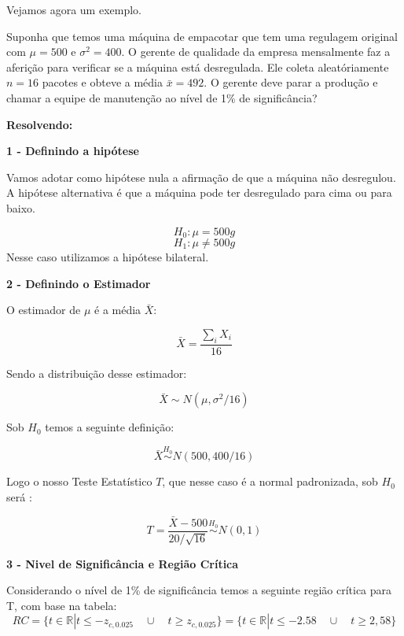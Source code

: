 \documentclass[
  letterpaper,
  DIV=11,
  numbers=noendperiod]{scrartcl}
\begin{document}
Vejamos agora um exemplo.

\begin{exemplo}

Suponha que temos uma máquina de empacotar que tem uma regulagem
original com \(\mu=500\) e \(\sigma^{2}=400\). O gerente de qualidade da
empresa mensalmente faz a aferição para verificar se a máquina está
desregulada. Ele coleta aleatóriamente \(n=16\) pacotes e obteve a média
\(\bar{x}=492\). O gerente deve parar a produção e chamar a equipe de
manutenção ao nível de 1\% de significância?

\end{exemplo}

\textbf{Resolvendo:}

\vspace{0.5cm}

\textbf{1 - Definindo a hipótese}

Vamos adotar como hipótese nula a afirmação de que a máquina não
desregulou. A hipótese alternativa é que a máquina pode ter desregulado
para cima ou para baixo.

\[H_0: \mu=500 g\] \[H_{1}: \mu \neq 500 g\] Nesse caso utilizamos a
hipótese bilateral.

\vspace{0.5cm}

\textbf{2 - Definindo o Estimador}

O estimador de \(\mu\) é a média \(\bar{X}\):

\[\bar{X}=\frac{\sum_iX_i}{16}\]

Sendo a distribuição desse estimador:

\[\bar{X}\sim N(\mu,\sigma^2/16)\]

Sob \(H_0\) temos a seguinte definição:

\[\bar{X}\overset{H_0}{\sim} N(500,400/16)\]

Logo o nosso Teste Estatístico \(T\), que nesse caso é a normal
padronizada, sob \(H_0\) será :

\[T=\frac{\bar{X}-500}{20/\sqrt{16}}\overset{H_0}{\sim} N(0,1)\]

\vspace{0.5cm}

\textbf{3 - Nivel de Significância e Região Crítica}

Considerando o nível de 1\% de significância temos a seguinte região
crítica para T, com base na tabela:\\

\[RC=\{t \in \mathbb{R} |t\leq - z_{c,0.025} \quad \cup \quad t\geq  z_{c,0.025}\}= \{ t \in \mathbb{R}| t\leq -2.58 \quad \cup \quad t\geq 2,58 \}\]
\end{document}

